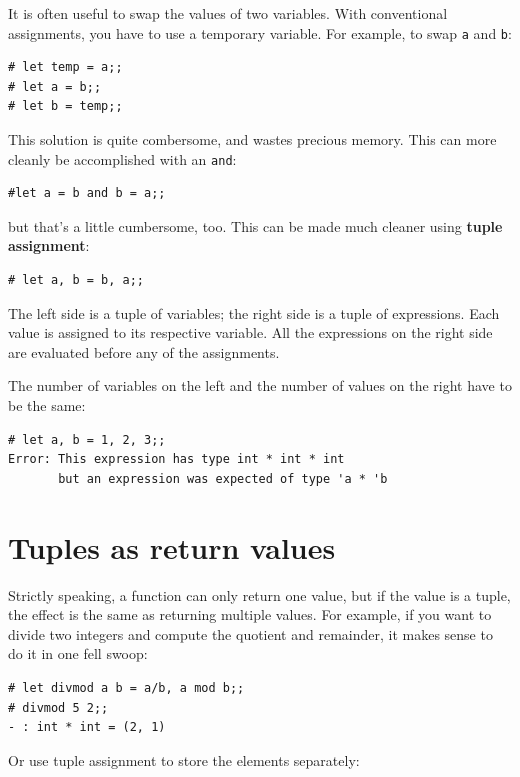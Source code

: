 \documentclass[10pt]{book}
\begin{document}
It is often useful to swap the values of two variables.
With conventional assignments, you have to use a temporary
variable.  For example, to swap {\tt a} and {\tt b}:

\beforeverb
\begin{verbatim}
# let temp = a;;
# let a = b;;
# let b = temp;;
\end{verbatim}
\afterverb
%
This solution is quite combersome, and wastes precious memory. This can more cleanly be accomplished with an {\tt and}:

\beforeverb
\begin{verbatim}
#let a = b and b = a;;
\end{verbatim}
\afterverb

but that's a little cumbersome, too. This can be made much cleaner using {\bf tuple assignment}:

\beforeverb
\begin{verbatim}
# let a, b = b, a;;
\end{verbatim}
\afterverb
%
The left side is a tuple of variables; the right side is a tuple of
expressions.  Each value is assigned to its respective variable.  
All the expressions on the right side are evaluated before any
of the assignments.

The number of variables on the left and the number of
values on the right have to be the same:


\beforeverb
\begin{verbatim}
# let a, b = 1, 2, 3;;
Error: This expression has type int * int * int
       but an expression was expected of type 'a * 'b
\end{verbatim}
\afterverb
%

\section{Tuples as return values}


Strictly speaking, a function can only return one value, but
if the value is a tuple, the effect is the same as returning
multiple values.  For example, if you want to divide two integers
and compute the quotient and remainder, it makes sense to do it in 
one fell swoop:

\beforeverb
\begin{verbatim}
# let divmod a b = a/b, a mod b;;
# divmod 5 2;;
- : int * int = (2, 1)
\end{verbatim}
\afterverb
%
Or use tuple assignment to store the elements separately:
\end{document}
